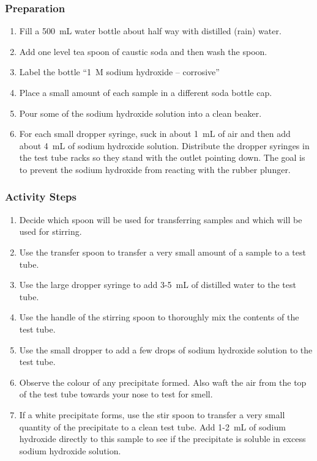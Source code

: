 \subsubsection{Preparation}
\begin{enumerate}
\item{Fill a 500~mL water bottle about half way with distilled (rain) water.}
\item{Add one level tea spoon of caustic soda and then wash the spoon.}
\item{Label the bottle ``1~M sodium hydroxide -- corrosive''}
\item{Place a small amount of each sample in a different soda bottle cap.}
\item{Pour some of the sodium hydroxide solution into a clean beaker.}
\item{For each small dropper syringe, suck in about 1~mL of air and then add about 4~mL of sodium hydroxide solution. Distribute the dropper syringes in the test tube racks so they stand with the outlet pointing down. The goal is to prevent the sodium hydroxide from reacting with the rubber plunger.}
\end{enumerate}

\subsubsection{Activity Steps}
\begin{enumerate}
\item{Decide which spoon will be used for transferring samples and which will be used for stirring.}
\item{Use the transfer spoon to transfer a very small amount of a sample to a test tube.}
\item{Use the large dropper syringe to add 3-5~mL of distilled water to the test tube.}
\item{Use the handle of the stirring spoon to thoroughly mix the contents of the test tube.}
\item{Use the small dropper to add a few drops of sodium hydroxide solution to the test tube.}
\item{Observe the colour of any precipitate formed. Also waft the air from the top of the test tube towards your nose to test for smell.}
\item{If a white precipitate forms, use the stir spoon to transfer a very small quantity of the precipitate to a clean test tube. Add 1-2~mL of sodium hydroxide directly to this sample to see if the precipitate is soluble in excess sodium hydroxide solution.}
\end{enumerate}

